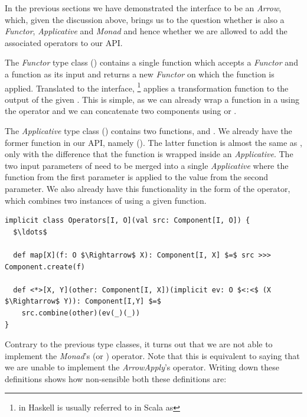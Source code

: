 In the previous sections we have demonstrated the \comp interface to be an \textit{Arrow}, which, given the discussion above, brings us to the question whether \comp is also a \textit{Functor}, \textit{Applicative} and \textit{Monad} and hence whether we are allowed to add the associated operators to our API.

The \textit{Functor} type class () contains a single function  which accepts a \textit{Functor} and a function as its input and returns a new \textit{Functor} on which the function is applied. Translated to the \comp interface, \footnote{ in Haskell is usually referred to in Scala as } applies a transformation function to the output of the given \comp. This is simple, as we can already wrap a function in a \comp using the  operator and we can concatenate two components using  or \code{(>>>)}.

The \textit{Applicative} type class () contains two functions,  and \code{(<*>)}. We already have the former function in our API, namely  (). The latter function is almost the same as , only with the difference that the function is wrapped inside an \textit{Applicative}. The two input parameters of \code{(<*>)} need to be merged into a single \textit{Applicative} where the function from the first parameter is applied to the value from the second parameter. We also already have this functionality in the form of the  operator, which combines two instances of \comp using a given function.

\begin{minipage}{\linewidth}
\begin{lstlisting}[style=ScalaStyle, caption={\textit{Functor} and \textit{Applicative} operators}, label={lst:functor-and-applicative}]
implicit class Operators[I, O](val src: Component[I, O]) {
  $\ldots$

  def map[X](f: O $\Rightarrow$ X): Component[I, X] $=$ src >>> Component.create(f)
  
  def <*>[X, Y](other: Component[I, X])(implicit ev: O $<:<$ (X $\Rightarrow$ Y)): Component[I,Y] $=$
    src.combine(other)(ev(_)(_))
}
\end{lstlisting}
\end{minipage}

Contrary to the previous type classes, it turns out that we are not able to implement the \textit{Monad}'s \code{(>>=)} (or ) operator. Note that this is equivalent to saying that we are unable to implement the \textit{ArrowApply}'s  operator. Writing down these definitions shows how non-sensible both these definitions are:

